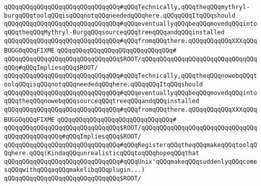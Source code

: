 \newline
\verb|qQQqqQQqqQQqqQQqqQQqqQQqqQQqqQQq#qQQqTechnically,qQQqtheqQQqmythryl-burgqQQqtoolqQQqisqQQqnotqQQqneededqQQqhere.qQQqqQQqItqQQqshould|\newline
\verb|qQQqqQQqqQQqqQQqqQQqqQQqqQQqqQQq#qQQqeventuallyqQQqbeqQQqmovedqQQqintoqQQqtheqQQqMythryl-BurgqQQqsourceqQQqtreeqQQqandqQQqinstalled|\newline
\verb|qQQqqQQqqQQqqQQqqQQqqQQqqQQqqQQq#qQQqfromqQQqthere.qQQqqQQqqQQqXXXqQQqBUGGOqQQqFIXME|\newline
\verb|qQQqqQQqqQQqqQQqqQQqqQQqqQQqqQQq#|\newline
\verb|qQQqqQQqqQQqqQQqqQQqqQQqqQQqqQQq$ROOT/|\verb|qQQqqQQqqQQqqQQqqQQqqQQqqQQqqQQqqQQq#qQQqImpliesqQQq$ROOT/|\newline
\newline
\verb|qQQqqQQqqQQqqQQqqQQqqQQqqQQqqQQq#qQQqTechnically,qQQqtheqQQqnowebqQQqtoolqQQqisqQQqnotqQQqneededqQQqhere.qQQqqQQqItqQQqshould|\newline
\verb|qQQqqQQqqQQqqQQqqQQqqQQqqQQqqQQq#qQQqeventuallyqQQqbeqQQqmovedqQQqintoqQQqtheqQQqnowebqQQqsourceqQQqtreeqQQqandqQQqinstalled|\newline
\verb|qQQqqQQqqQQqqQQqqQQqqQQqqQQqqQQq#qQQqfromqQQqthere.qQQqqQQqqQQqXXXqQQqBUGGOqQQqFIXME|\newline
\verb|qQQqqQQqqQQqqQQqqQQqqQQqqQQqqQQq#|\newline
\verb|qQQqqQQqqQQqqQQqqQQqqQQqqQQqqQQq$ROOT/|\verb|qQQqqQQqqQQqqQQqqQQqqQQqqQQqqQQqqQQqqQQqqQQqqQQq#qQQqImpliesqQQq$ROOT/|\newline
\newline
\verb|qQQqqQQqqQQqqQQqqQQqqQQqqQQqqQQq#qQQqRegisterqQQqtheqQQqmakeqQQqtoolqQQqhere.qQQq(KindaqQQqunrealisticqQQqtoqQQqhopeqQQqthat|\newline
\verb|qQQqqQQqqQQqqQQqqQQqqQQqqQQqqQQq#qQQqUnix'qQQqmakeqQQqsuddenlyqQQqcomesqQQqwithqQQqaqQQqmakelibqQQqplugin...)|\newline
\verb|qQQqqQQqqQQqqQQqqQQqqQQqqQQqqQQq$ROOT/|\newline
